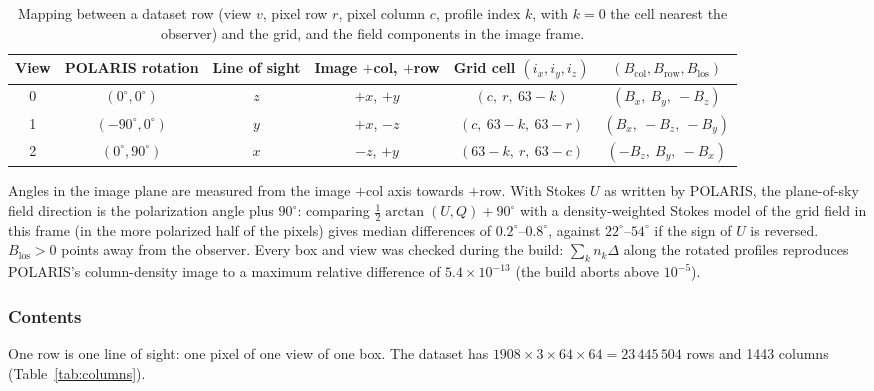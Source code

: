 \begin{table}[ht]
  \centering
  \caption{Mapping between a dataset row (view $v$, pixel row $r$, pixel column $c$, profile index $k$, with $k=0$
  the cell nearest the observer) and the grid, and the field components in the image frame.}
  \label{tab:views}
  \small
  \begin{tabular}{@{}cccccc@{}}
    \toprule
    View & POLARIS rotation & Line of sight & Image $+$col, $+$row & Grid cell $(i_x,i_y,i_z)$ & $(B_\mathrm{col},B_\mathrm{row},B_\mathrm{los})$ \\
    \midrule
    0 & $(0^\circ,0^\circ)$   & $z$ & $+x$, $+y$ & $(c,\ r,\ 63-k)$    & $(B_x,\ B_y,\ -B_z)$ \\
    1 & $(-90^\circ,0^\circ)$ & $y$ & $+x$, $-z$ & $(c,\ 63-k,\ 63-r)$ & $(B_x,\ -B_z,\ -B_y)$ \\
    2 & $(0^\circ,90^\circ)$  & $x$ & $-z$, $+y$ & $(63-k,\ r,\ 63-c)$ & $(-B_z,\ B_y,\ -B_x)$ \\
    \bottomrule
  \end{tabular}
\end{table}

Angles in the image plane are measured from the image $+$col axis towards $+$row. With Stokes $U$ as written by
POLARIS, the plane-of-sky field direction is the polarization angle plus $90^\circ$: comparing
$\tfrac12\arctan(U,Q)+90^\circ$ with a density-weighted Stokes model of the grid field in this frame (in the more
polarized half of the pixels) gives median differences of $0.2^\circ$--$0.8^\circ$, against $22^\circ$--$54^\circ$ if the
sign of $U$ is reversed. $B_\mathrm{los}>0$ points away from the
observer. Every box and view was checked during the build: $\sum_k n_k\Delta$ along the rotated profiles
reproduces POLARIS's column-density image to a maximum relative difference of $5.4\times10^{-13}$
(the build aborts above $10^{-5}$).

\subsubsection{Contents}

One row is one line of sight: one pixel of one view of one box. The dataset has
$1908\times3\times64\times64=23\,445\,504$ rows and 1443 columns (Table~\ref{tab:columns}).

